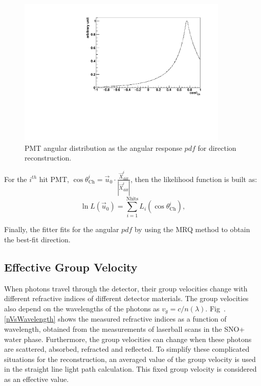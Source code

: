 \begin{figure}[!htb]
	\centering
	\includegraphics[width=10cm]{MPW_angularPDF.pdf}
	\caption{PMT angular distribution as the angular response $pdf$ for direction reconstruction.}
	\label{fig:MPW_angularPDF}
\end{figure}

For the $i^{th}$ hit PMT, $\cos\theta^i_{\mathrm{Ch}}=\vec{u}_0\cdot\frac{\vec{X}^i_{{\mathrm{diff}}}}{|\vec{X}^i_{{\mathrm{diff}}}|}$, then the likelihood function is built as:
\begin{equation}
\ln L(\vec{u}_0)=\sum_{i=1}^{{\mathrm{Nhits}}}L_i(\cos\theta_{\mathrm{Ch}}^i),
\end{equation}

Finally, the fitter fits for the angular $pdf$ by using the MRQ method to obtain the best-fit direction.

\subsection{Effective Group Velocity}\label{sect:tuneGroupVelocity}
When photons travel through the detector, their group velocities change with different refractive indices of different detector materials. The group velocities also depend on the wavelengths of the photons as $v_g=c/n(\lambda)$. Fig~.\ref{nVsWavelength} shows the measured refractive indices as a function of wavelength, obtained from the measurements of laserball scans in the SNO+ water phase\cite{laserball_groupVelocity}. Furthermore, the group velocities can change when these photons are scattered, absorbed, refracted and reflected. To simplify these complicated situations for the reconstruction, an averaged value of the group velocity is used in the straight line light path calculation. This fixed group velocity is considered as an effective value.

